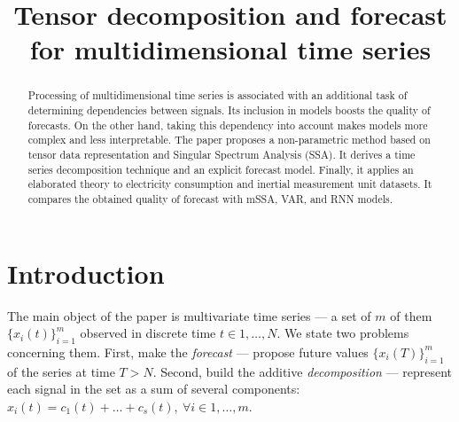 \documentclass[referee, pdflatex, sn-mathphys-num]{sn-jnl}
\theoremstyle{definition}
\theoremstyle{plain}
\begin{document}
	
	\title{Tensor decomposition and forecast for multidimensional time series}
	
	\author*[1]{ }
	\author*[2]{ }
	
	
	
	\maketitle
	
	\begin{abstract}
		
		Processing of multidimensional time series is associated with an additional task of determining dependencies between signals. Its inclusion in models boosts the quality of forecasts. On the other hand, taking this dependency into account makes models more complex and less interpretable. The paper proposes a non-parametric method based on tensor data representation and Singular Spectrum Analysis (SSA). It derives a time series decomposition technique and an explicit forecast model. Finally, it applies an elaborated theory to electricity consumption and inertial measurement unit datasets. It compares the obtained quality of forecast with mSSA, VAR, and RNN models.
		
	\end{abstract}
	
	\section{Introduction}\label{Intro}
	
	The main object of the paper is multivariate time series --- a set of $ m $ of them $ \{x_i(t)\}_{i=1}^m $ observed in discrete time $ t \in 1 , \ldots , N $.	We state two problems concerning them. First, make the \emph{forecast} --- propose future values $ \{x_i(T)\}_{i=1}^m $ of the series at time $ T > N $. Second, build the additive \emph{decomposition} --- represent each signal in the set as a sum of several components: $ x_i(t) = c_1(t) + \ldots + c_s(t), \ \forall i \in 1, \ldots , m $.
	
\end{document}
